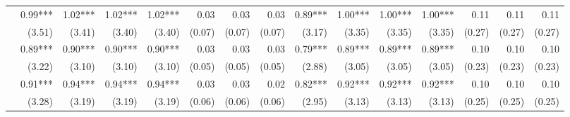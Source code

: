 \begin{tabularx}{1.45\textwidth}{lRRRRRRRRRRRRRR}
		 & \num{0.99}***\phantom{)} & \num{1.02}***\phantom{)} & \num{1.02}***\phantom{)} & \num{1.02}***\phantom{)} & \num{0.03}\phantom{***)} & \num{0.03}\phantom{***)} & \num{0.03}\phantom{***)} & \num{0.89}***\phantom{)} & \num{1.00}***\phantom{)} & \num{1.00}***\phantom{)} & \num{1.00}***\phantom{)} & \num{0.11}\phantom{***)} & \num{0.11}\phantom{***)} & \num{0.11}\phantom{***)} \\
		 & (\num{3.51})\phantom{***} & (\num{3.41})\phantom{***} & (\num{3.40})\phantom{***} & (\num{3.40})\phantom{***} & (\num{0.07})\phantom{***} & (\num{0.07})\phantom{***} & (\num{0.07})\phantom{***} & (\num{3.17})\phantom{***} & (\num{3.35})\phantom{***} & (\num{3.35})\phantom{***} & (\num{3.35})\phantom{***} & (\num{0.27})\phantom{***} & (\num{0.27})\phantom{***} & (\num{0.27})\phantom{***} \\ [\dspacing]
		 & \num{0.89}***\phantom{)} & \num{0.90}***\phantom{)} & \num{0.90}***\phantom{)} & \num{0.90}***\phantom{)} & \num{0.03}\phantom{***)} & \num{0.03}\phantom{***)} & \num{0.03}\phantom{***)} & \num{0.79}***\phantom{)} & \num{0.89}***\phantom{)} & \num{0.89}***\phantom{)} & \num{0.89}***\phantom{)} & \num{0.10}\phantom{***)} & \num{0.10}\phantom{***)} & \num{0.10}\phantom{***)} \\
		 & (\num{3.22})\phantom{***} & (\num{3.10})\phantom{***} & (\num{3.10})\phantom{***} & (\num{3.10})\phantom{***} & (\num{0.05})\phantom{***} & (\num{0.05})\phantom{***} & (\num{0.05})\phantom{***} & (\num{2.88})\phantom{***} & (\num{3.05})\phantom{***} & (\num{3.05})\phantom{***} & (\num{3.05})\phantom{***} & (\num{0.23})\phantom{***} & (\num{0.23})\phantom{***} & (\num{0.23})\phantom{***} \\ [\dspacing]
		 & \num{0.91}***\phantom{)} & \num{0.94}***\phantom{)} & \num{0.94}***\phantom{)} & \num{0.94}***\phantom{)} & \num{0.03}\phantom{***)} & \num{0.03}\phantom{***)} & \num{0.02}\phantom{***)} & \num{0.82}***\phantom{)} & \num{0.92}***\phantom{)} & \num{0.92}***\phantom{)} & \num{0.92}***\phantom{)} & \num{0.10}\phantom{***)} & \num{0.10}\phantom{***)} & \num{0.10}\phantom{***)} \\
		 & (\num{3.28})\phantom{***} & (\num{3.19})\phantom{***} & (\num{3.19})\phantom{***} & (\num{3.19})\phantom{***} & (\num{0.06})\phantom{***} & (\num{0.06})\phantom{***} & (\num{0.06})\phantom{***} & (\num{2.95})\phantom{***} & (\num{3.13})\phantom{***} & (\num{3.13})\phantom{***} & (\num{3.13})\phantom{***} & (\num{0.25})\phantom{***} & (\num{0.25})\phantom{***} & (\num{0.25})\phantom{***} \\ [\dspacing]

\end{tabularx}
